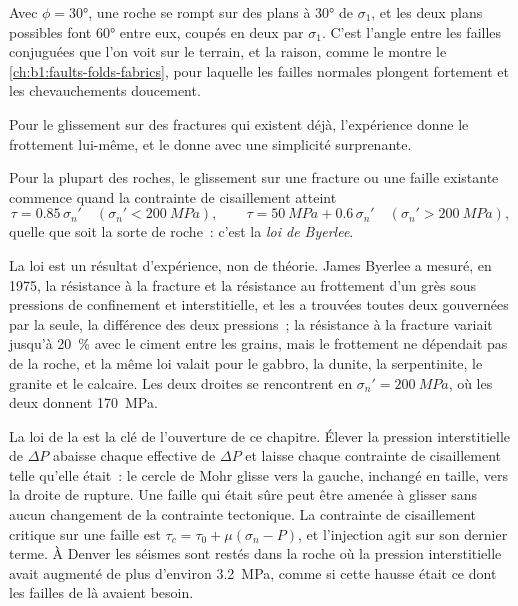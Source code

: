Avec $\phi = \ang{30}$, une roche se rompt sur des plans à \ang{30} de $\sigma_1$, et
les deux plans possibles font \ang{60} entre eux, coupés en deux par
$\sigma_1$. C'est l'angle entre les failles conjuguées que l'on voit sur
le terrain, et la raison, comme le montre le \cref{ch:b1:faults-folds-fabrics}, pour laquelle les
failles normales plongent fortement et les chevauchements doucement.

Pour le glissement sur des fractures qui existent déjà, l'expérience donne le frottement
lui-même, et le donne avec une simplicité surprenante.

\begin{proposition}\label{prop:b1:stress-strain-rheology:byerlee}
Pour la plupart des roches, le glissement sur une fracture ou une faille existante commence quand la contrainte de
cisaillement atteint
\[
  \tau = 0.85\,\sigma_n' \quad (\sigma_n' < \qty{200}{MPa}), \qquad
  \tau = \qty{50}{MPa} + 0.6\,\sigma_n' \quad (\sigma_n' > \qty{200}{MPa}),
\]
quelle que soit la sorte de roche~: c'est la \emph{loi de Byerlee}.
\end{proposition}
\admitted

La loi est un résultat d'expérience, non de théorie. James Byerlee a mesuré, en
1975, la résistance à la fracture et la résistance au frottement d'un grès sous
pressions de confinement et interstitielle, et les a trouvées toutes deux gouvernées par la 
seule, la différence des deux pressions~; la résistance à la fracture
variait jusqu'à \qty{20}{\percent} avec le ciment entre les grains, mais le
frottement ne dépendait pas de la roche, et la même loi valait pour le gabbro,
la dunite, la serpentinite, le granite et le calcaire. Les deux droites se rencontrent en
$\sigma_n' = \qty{200}{MPa}$, où les deux donnent \qty{170}{MPa}.

La loi de la  est la clé de l'ouverture de ce chapitre. Élever
la pression interstitielle de $\Delta P$ abaisse chaque  effective de
$\Delta P$ et laisse chaque contrainte de cisaillement telle qu'elle était~: le cercle de Mohr glisse vers
la gauche, inchangé en taille, vers la droite de rupture. Une faille qui était sûre
peut être amenée à glisser sans aucun changement de la contrainte tectonique. La
contrainte de cisaillement critique sur une faille est $\tau_c = \tau_0 + \mu(\sigma_n - P)$,
et l'injection agit sur son dernier terme. À Denver les séismes sont restés dans la
roche où la pression interstitielle avait augmenté de plus d'environ \qty{3.2}{MPa}, comme
si cette hausse était ce dont les failles de là avaient besoin.

